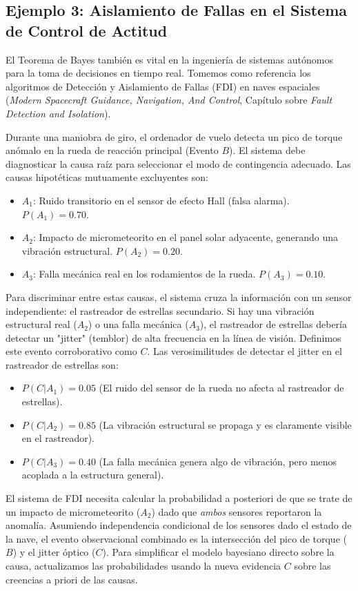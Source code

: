 \subsection{Ejemplo 3: Aislamiento de Fallas en el Sistema de Control de Actitud}

El Teorema de Bayes también es vital en la ingeniería de sistemas autónomos para la toma de decisiones en tiempo real. Tomemos como referencia los algoritmos de Detección y Aislamiento de Fallas (FDI) en naves espaciales (\textit{Modern Spacecraft Guidance, Navigation, And Control}, Capítulo sobre \textit{Fault Detection and Isolation}).

Durante una maniobra de giro, el ordenador de vuelo detecta un pico de torque anómalo en la rueda de reacción principal (Evento $B$). El sistema debe diagnosticar la causa raíz para seleccionar el modo de contingencia adecuado. Las causas hipotéticas mutuamente excluyentes son:
\begin{itemize}
    \item $A_1$: Ruido transitorio en el sensor de efecto Hall (falsa alarma). $P(A_1) = 0.70$.
    \item $A_2$: Impacto de micrometeorito en el panel solar adyacente, generando una vibración estructural. $P(A_2) = 0.20$.
    \item $A_3$: Falla mecánica real en los rodamientos de la rueda. $P(A_3) = 0.10$.
\end{itemize}

Para discriminar entre estas causas, el sistema cruza la información con un sensor independiente: el rastreador de estrellas secundario. Si hay una vibración estructural real ($A_2$) o una falla mecánica ($A_3$), el rastreador de estrellas debería detectar un "jitter" (temblor) de alta frecuencia en la línea de visión. Definimos este evento corroborativo como $C$. Las verosimilitudes de detectar el jitter en el rastreador de estrellas son:
\begin{itemize}
    \item $P(C | A_1) = 0.05$ (El ruido del sensor de la rueda no afecta al rastreador de estrellas).
    \item $P(C | A_2) = 0.85$ (La vibración estructural se propaga y es claramente visible en el rastreador).
    \item $P(C | A_3) = 0.40$ (La falla mecánica genera algo de vibración, pero menos acoplada a la estructura general).
\end{itemize}

El sistema de FDI necesita calcular la probabilidad a posteriori de que se trate de un impacto de micrometeorito ($A_2$) dado que \textit{ambos} sensores reportaron la anomalía. Asumiendo independencia condicional de los sensores dado el estado de la nave, el evento observacional combinado es la intersección del pico de torque ($B$) y el jitter óptico ($C$). Para simplificar el modelo bayesiano directo sobre la causa, actualizamos las probabilidades usando la nueva evidencia $C$ sobre las creencias a priori de las causas.

